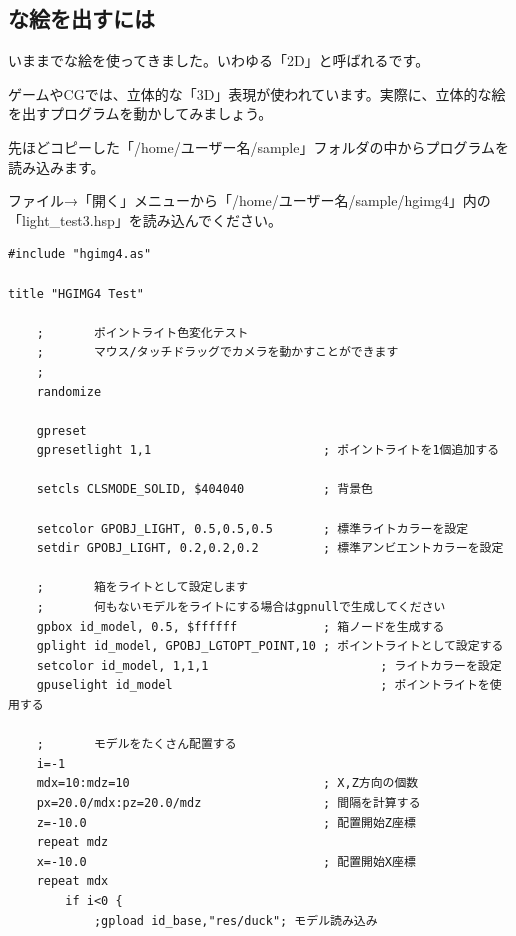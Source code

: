 \documentclass[text04.tex]{subfiles}
\begin{document}


\newpage
\subsection{な絵を出すには}

いままでな絵を使ってきました。いわゆる「2D」と呼ばれるです。

ゲームやCGでは、立体的な「3D」表現が使われています。実際に、立体的な絵を出すプログラムを動かしてみましょう。


先ほどコピーした「/home/ユーザー名/sample」フォルダの中からプログラムを読み込みます。

ファイル→「開く」メニューから「/home/ユーザー名/sample/hgimg4」内の「light\_test3.hsp」を読み込んでください。


\begin{lstlisting}[caption=light\_test3.hspのプログラムの一部]
#include "hgimg4.as"

title "HGIMG4 Test"

    ;       ポイントライト色変化テスト
    ;       マウス/タッチドラッグでカメラを動かすことができます
    ;
    randomize

    gpreset
    gpresetlight 1,1                        ; ポイントライトを1個追加する

    setcls CLSMODE_SOLID, $404040           ; 背景色

    setcolor GPOBJ_LIGHT, 0.5,0.5,0.5       ; 標準ライトカラーを設定
    setdir GPOBJ_LIGHT, 0.2,0.2,0.2         ; 標準アンビエントカラーを設定

    ;       箱をライトとして設定します
    ;       何もないモデルをライトにする場合はgpnullで生成してください
    gpbox id_model, 0.5, $ffffff            ; 箱ノードを生成する
    gplight id_model, GPOBJ_LGTOPT_POINT,10 ; ポイントライトとして設定する
    setcolor id_model, 1,1,1                        ; ライトカラーを設定
    gpuselight id_model                             ; ポイントライトを使用する

    ;       モデルをたくさん配置する
    i=-1
    mdx=10:mdz=10                           ; X,Z方向の個数
    px=20.0/mdx:pz=20.0/mdz                 ; 間隔を計算する
    z=-10.0                                 ; 配置開始Z座標
    repeat mdz
    x=-10.0                                 ; 配置開始X座標
    repeat mdx
        if i<0 {
            ;gpload id_base,"res/duck"; モデル読み込み

\end{lstlisting}
\end{document}
